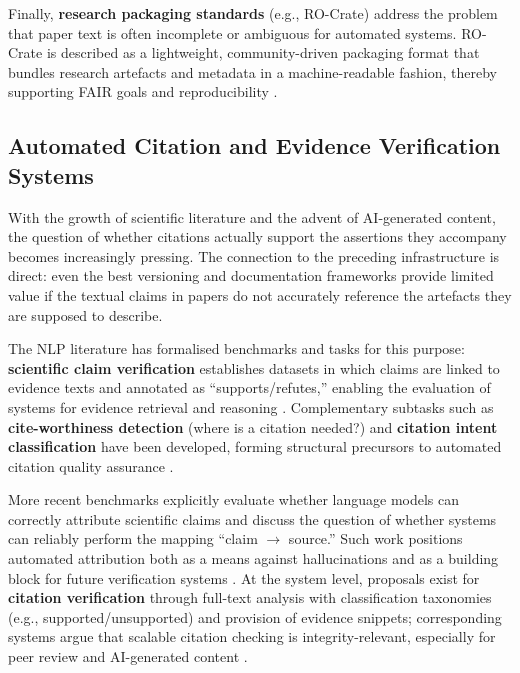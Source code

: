 \documentclass[12pt, a4paper]{article}
\begin{document}
Finally, \textbf{research packaging standards} (e.g., RO-Crate) address
the problem that paper text is often incomplete or ambiguous for
automated systems.  RO-Crate is described as a lightweight,
community-driven packaging format that bundles research artefacts and
metadata in a machine-readable fashion, thereby supporting FAIR goals
and reproducibility \cite{SoilandReyes2022}.

\subsection{Automated Citation and Evidence Verification Systems}
\label{sec:verification}

With the growth of scientific literature and the advent of AI-generated
content, the question of whether citations actually support the
assertions they accompany becomes increasingly pressing.  The connection
to the preceding infrastructure is direct: even the best versioning and
documentation frameworks provide limited value if the textual claims in
papers do not accurately reference the artefacts they are supposed to
describe.

The NLP literature has formalised benchmarks and tasks for this purpose:
\textbf{scientific claim verification} establishes datasets in which
claims are linked to evidence texts and annotated as
``supports/refutes,'' enabling the evaluation of systems for evidence
retrieval and reasoning \cite{Wadden2020}.  Complementary subtasks such
as \textbf{cite-worthiness detection} (where is a citation needed?) and
\textbf{citation intent classification} have been developed, forming
structural precursors to automated citation quality assurance
\cite{Wright2021}.

More recent benchmarks explicitly evaluate whether language models can
correctly attribute scientific claims and discuss the question of
whether systems can reliably perform the mapping ``claim $\to$ source.''
Such work positions automated attribution both as a means against
hallucinations and as a building block for future verification systems
\cite{Press2024}.  At the system level, proposals exist for
\textbf{citation verification} through full-text analysis with
classification taxonomies (e.g., supported/unsupported) and provision of
evidence snippets; corresponding systems argue that scalable citation
checking is integrity-relevant, especially for peer review and
AI-generated content \cite{SemanticCite2025}.
\end{document}
